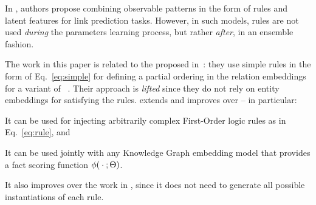%
In \cite{DBLP:conf/kdd/0001GHHLMSSZ14,DBLP:conf/nips/NickelJT14,DBLP:conf/ijcai/WangWG15}, authors propose combining observable patterns in the form of rules and latent features for link prediction tasks.
%
However, in such models, rules are not used \emph{during} the parameters learning process, but rather \emph{after}, in an ensemble fashion.
%

%
The work in this paper is related to the  proposed in~\cite{DBLP:conf/emnlp/DemeesterRR16}: they use simple rules in the form of Eq.~\ref{eq:simple} for defining a partial ordering in the relation embeddings for a variant of ~\cite{DBLP:conf/naacl/RiedelYMM13}.
%
Their approach is \emph{lifted} since they do not rely on entity embeddings for satisfying the rules.
%
\ARI extends and improves over  -- in particular:
%
\begin{inparaenum}[1)]
%
 \item It can be used for injecting arbitrarily complex First-Order logic rules as in Eq.~\ref{eq:rule}, and
%
 \item It can be used jointly with any Knowledge Graph embedding model that provides a fact scoring function $\phi({}\cdot{} ; \Theta)$.
%
\end{inparaenum}
%
It also improves over the work in \cite{DBLP:conf/naacl/RocktaschelSR15}, since it does not need to generate all possible instantiations of each rule.
%